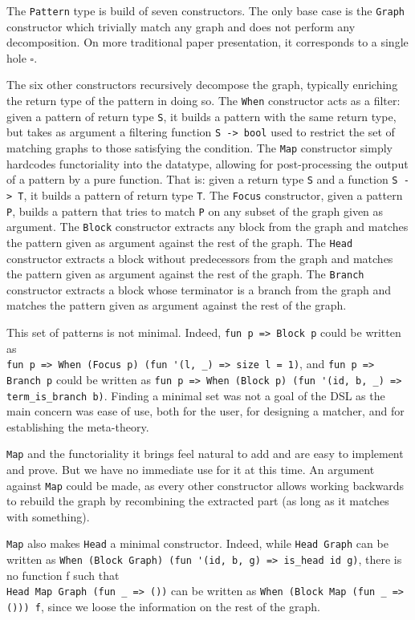 \documentclass[11pt]{article}
\newcommand{\inlinecoq}[1]{\mbox{\lstinline[style=customcoq,columns=fixed,basewidth=.48em]{#1}}}
\newcommand{\ilc}[1]{\inlinecoq{#1}}
\begin{document}
The \ilc{Pattern} type is build of seven constructors. The only base case is the \ilc{Graph} constructor which trivially match any graph and does not perform any decomposition. On more traditional paper presentation, it corresponds to a single hole $\square$.

The six other constructors recursively decompose the graph, typically enriching the return type of the pattern in doing so. 
The \ilc{When} constructor acts as a filter:
given a pattern of return type \ilc{S}, it builds a pattern with the same return type, but takes as argument a filtering function \ilc{S -> bool} used to restrict the set of matching graphs to those satisfying the condition.
The \ilc{Map} constructor simply hardcodes functoriality into the datatype, allowing for post-processing the output of a pattern by a pure function. That is: given a return type \ilc{S} and a function \ilc{S -> T}, it builds a pattern of return type \ilc{T}.
The \ilc{Focus} constructor, given a pattern \ilc{P}, builds a pattern that tries to match \ilc{P} on any subset of the graph given as argument.
The \ilc{Block} constructor extracts any block from the graph and matches the pattern given as argument against the rest of the graph.
The \ilc{Head} constructor extracts a block without predecessors from the graph and matches the pattern given as argument against the rest of the graph.
The \ilc{Branch} constructor extracts a block whose terminator is a branch from the graph and matches the pattern given as argument against the rest of the graph.

This set of patterns is not minimal. Indeed, \ilc{fun p => Block p} could be written as\\\ilc{fun p => When (Focus p) (fun '(l, _) => size l = 1)}, and \ilc{fun p => Branch p} could be written as \ilc{fun p => When (Block p) (fun '(id, b, _) => term_is_branch b)}. Finding a minimal set was not a goal of the DSL as the main concern was ease of use, both for the user, for designing a matcher, and for establishing the meta-theory. 

\ilc{Map} and the functoriality it brings feel natural to add and are easy to implement and prove. But we have no immediate use for it at this time. An argument against \ilc{Map} could be made, as every other constructor allows working backwards to rebuild the graph by recombining the extracted part (as long as it matches with something).

\ilc{Map} also makes \ilc{Head} a minimal constructor. Indeed, while \ilc{Head Graph} can be written as \ilc{When (Block Graph) (fun '(id, b, g) => is_head id g)}, there is no function f such that\\\ilc{Head Map Graph (fun _ => ())} can be written as \ilc{When (Block Map (fun _ => ())) f}, since we loose the information on the rest of the graph.
\end{document}
